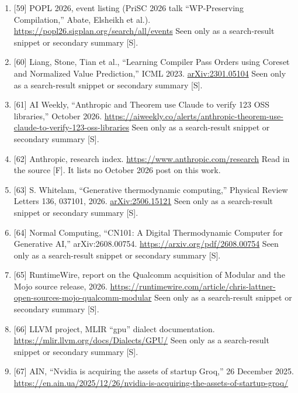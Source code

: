 \documentclass[10pt,letterpaper]{article}
\begin{document}
\begin{enumerate}
  llvm/llvm-project by month, April to October 2026, queried with
  \texttt{gh\ api\ search/\allowbreak{}commits} on 1 November 2026. Read in the
  source {[}F{]}. The index covers the default branch and can lag, so
  the counts are lower bounds.
\item
  {[}59{]} POPL 2026, event listing (PriSC 2026 talk ``WP-Preserving
  Compilation,'' Abate, Elsheikh et al.).
  \url{https://popl26.sigplan.org/search/all/events} Seen only as a
  search-result snippet or secondary summary {[}S{]}.
\item
  {[}60{]} Liang, Stone, Tian et al., ``Learning Compiler Pass Orders
  using Coreset and Normalized Value Prediction,'' ICML 2023.
  \href{https://arxiv.org/abs/2301.05104}{arXiv:2301.05104} Seen only as
  a search-result snippet or secondary summary {[}S{]}.
\item
  {[}61{]} AI Weekly, ``Anthropic and Theorem use Claude to verify 123
  OSS libraries,'' October 2026.
  \url{https://aiweekly.co/alerts/anthropic-theorem-use-claude-to-verify-123-oss-libraries}
  Seen only as a search-result snippet or secondary summary {[}S{]}.
\item
  {[}62{]} Anthropic, research index.
  \url{https://www.anthropic.com/research} Read in the source {[}F{]}.
  It lists no October 2026 post on this work.
\item
  {[}63{]} S. Whitelam, ``Generative thermodynamic computing,'' Physical
  Review Letters 136, 037101, 2026.
  \href{https://arxiv.org/html/2506.15121v3}{arXiv:2506.15121} Seen only
  as a search-result snippet or secondary summary {[}S{]}.
\item
  {[}64{]} Normal Computing, ``CN101: A Digital Thermodynamic Computer
  for Generative AI,'' arXiv:2608.00754.
  \url{https://arxiv.org/pdf/2608.00754} Seen only as a search-result
  snippet or secondary summary {[}S{]}.
\item
  {[}65{]} RuntimeWire, report on the Qualcomm acquisition of Modular
  and the Mojo source release, 2026.
  \url{https://runtimewire.com/article/chris-lattner-open-sources-mojo-qualcomm-modular}
  Seen only as a search-result snippet or secondary summary {[}S{]}.
\item
  {[}66{]} LLVM project, MLIR ``gpu'' dialect documentation.
  \url{https://mlir.llvm.org/docs/Dialects/GPU/} Seen only as a
  search-result snippet or secondary summary {[}S{]}.
\item
  {[}67{]} AIN, ``Nvidia is acquiring the assets of startup Groq,'' 26
  December 2025.
  \url{https://en.ain.ua/2025/12/26/nvidia-is-acquiring-the-assets-of-startup-groq/}

\end{enumerate}
\end{document}

